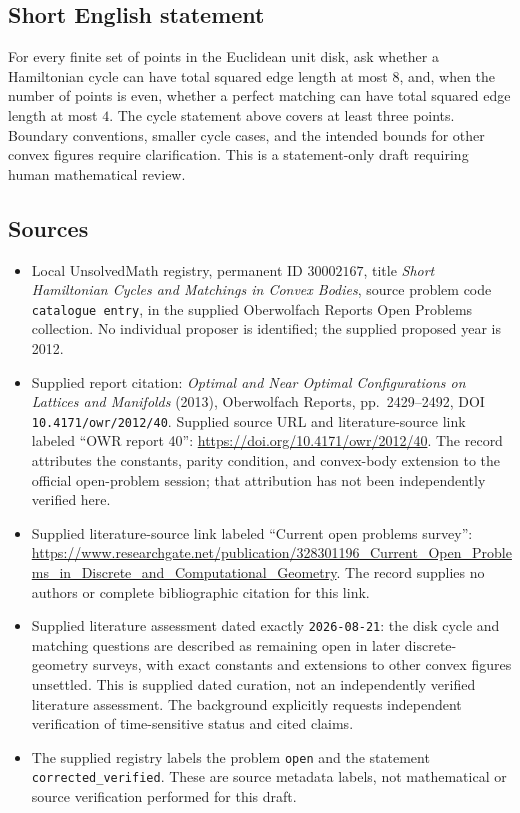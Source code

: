 \documentclass[11pt]{article}
\begin{document}
\subsection{Short English statement}
For every finite set of points in the Euclidean unit disk, ask whether a Hamiltonian cycle can have total squared edge length at most \(8\), and, when the number of points is even, whether a perfect matching can have total squared edge length at most \(4\). The cycle statement above covers at least three points. Boundary conventions, smaller cycle cases, and the intended bounds for other convex figures require clarification. This is a statement-only draft requiring human mathematical review.
\subsection{Sources}
\begin{itemize}
\item Local UnsolvedMath registry, permanent ID \(30002167\), title \emph{Short Hamiltonian Cycles and Matchings in Convex Bodies}, source problem code \texttt{catalogue entry}, in the supplied Oberwolfach Reports Open Problems collection. No individual proposer is identified; the supplied proposed year is 2012.
\item Supplied report citation: \emph{Optimal and Near Optimal Configurations on Lattices and Manifolds} (2013), Oberwolfach Reports, pp.\ 2429--2492, DOI \texttt{10.4171/owr/2012/40}. Supplied source URL and literature-source link labeled ``OWR report 40'': \url{https://doi.org/10.4171/owr/2012/40}. The record attributes the constants, parity condition, and convex-body extension to the official open-problem session; that attribution has not been independently verified here.
\item Supplied literature-source link labeled ``Current open problems survey'': \url{https://www.researchgate.net/publication/328301196_Current_Open_Problems_in_Discrete_and_Computational_Geometry}. The record supplies no authors or complete bibliographic citation for this link.
\item Supplied literature assessment dated exactly \texttt{2026-08-21}: the disk cycle and matching questions are described as remaining open in later discrete-geometry surveys, with exact constants and extensions to other convex figures unsettled. This is supplied dated curation, not an independently verified literature assessment. The background explicitly requests independent verification of time-sensitive status and cited claims.
\item The supplied registry labels the problem \texttt{open} and the statement \texttt{corrected\_verified}. These are source metadata labels, not mathematical or source verification performed for this draft.
\end{itemize}
\end{document}

